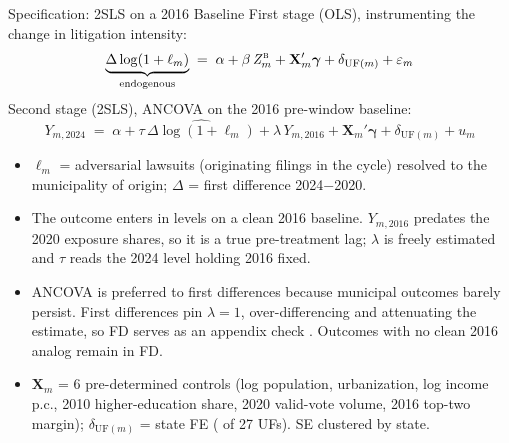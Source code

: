 

\begin{frame}{Specification: 2SLS on a 2016 Baseline}
\hypertarget{src:spec}{}
\small
First stage (OLS), instrumenting the change in litigation intensity:
\[
\underbrace{\Delta\log(1+\ell_{m})}_{\text{endogenous}} \;=\; \alpha + \beta\, \mathit{Z}_{m}^{\textsc{b}} + \mathbf{X}_m'\boldsymbol{\gamma} + \delta_{\text{UF}(m)} + \varepsilon_m
\]
Second stage (2SLS), ANCOVA on the 2016 pre-window baseline:
\[
Y_{m,2024} \;=\; \alpha + \tau\, \widehat{\Delta\log(1+\ell_{m})} + \lambda\, Y_{m,2016} + \mathbf{X}_m'\boldsymbol{\gamma} + \delta_{\text{UF}(m)} + u_m
\]
\begin{itemize}\itemsep1pt
  \item $\ell_m$ = adversarial lawsuits (originating filings in the cycle) resolved to the municipality of origin; $\Delta$ = first difference 2024$-$2020.
  \item The outcome enters in levels on a clean 2016 baseline. $Y_{m,2016}$ predates the 2020 exposure shares, so it is a true pre-treatment lag; $\lambda$ is freely estimated and $\tau$ reads the 2024 level holding 2016 fixed.
  \item \hypertarget{src:fd}{}ANCOVA is preferred to first differences because municipal outcomes barely persist. First differences pin $\lambda=1$, over-differencing and attenuating the estimate, so FD serves as an appendix check \hyperlink{app:fd}{}. Outcomes with no clean 2016 analog remain in FD.
  \item $\mathbf{X}_m$ = 6 pre-determined controls (log population, urbanization, log income p.c., 2010 higher-education share, 2020 valid-vote volume, 2016 top-two margin); $\delta_{\text{UF}(m)}$ = state FE (\NClusters{} of 27 UFs). SE clustered by state.
\end{itemize}
\centerline{\footnotesize \hyperlink{app:readtau}{}}
\end{frame}
